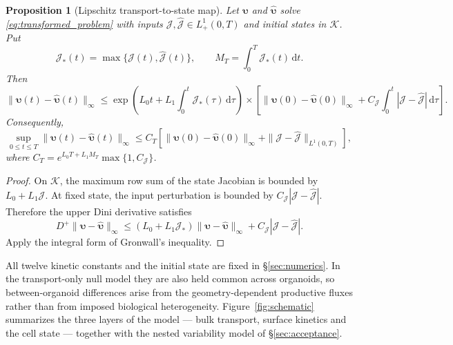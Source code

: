 \documentclass[pdflatex,sn-mathphys-num]{sn-jnl}
\numberwithin{equation}{section}
\theoremstyle{thmstyleone}%
\newtheorem{proposition}[theorem]{Proposition}
\theoremstyle{definition}
\theoremstyle{remark}
\begin{document}
\begin{proposition}[Lipschitz transport-to-state map]
\label{prop:app_input_state}
Let $\boldsymbol\upsilon$ and $\widehat{\boldsymbol\upsilon}$ solve
\eqref{eq:transformed_problem} with inputs $\mathcal J,\widehat{\mathcal J}\in
L^1_+(0,T)$ and initial states in $\mathcal K$. Put
\[
\mathcal J_*(t)=\max\{\mathcal J(t),\widehat{\mathcal J}(t)\},
\qquad M_T=\int_0^T\mathcal J_*(t)\,\mathrm dt.
\]
Then
\begin{equation}
\|\boldsymbol\upsilon(t)-\widehat{\boldsymbol\upsilon}(t)\|_\infty
\leq \exp\!\left(L_0t+L_1\int_0^t\mathcal J_*(\tau)\,\mathrm d\tau\right) \times\left[
\|\boldsymbol\upsilon(0)-\widehat{\boldsymbol\upsilon}(0)\|_\infty
+C_{\mathcal J}\int_0^t|\mathcal J-\widehat{\mathcal J}|\,\mathrm d\tau
\right].
\label{eq:app_input_state_bound}
\end{equation}
Consequently,
\begin{equation}
\sup_{0\leq t\leq T}
\|\boldsymbol\upsilon(t)-\widehat{\boldsymbol\upsilon}(t)\|_\infty
\leq C_T\left[
\|\boldsymbol\upsilon(0)-\widehat{\boldsymbol\upsilon}(0)\|_\infty
+\|\mathcal J-\widehat{\mathcal J}\|_{L^1(0,T)}\right],
\label{eq:app_gronwall_bound}
\end{equation}
where $C_T=e^{L_0T+L_1M_T}\max\{1,C_{\mathcal J}\}$.
\end{proposition}

\begin{proof}
On $\mathcal K$, the maximum row sum of the state Jacobian is bounded by
$L_0+L_1\mathcal J$. At fixed state, the input perturbation is bounded by
$C_{\mathcal J}|\mathcal J-\widehat{\mathcal J}|$. Therefore the upper Dini
derivative satisfies
\[
D^+\|\boldsymbol\upsilon-\widehat{\boldsymbol\upsilon}\|_\infty
\leq(L_0+L_1\mathcal J_*)
\|\boldsymbol\upsilon-\widehat{\boldsymbol\upsilon}\|_\infty
+C_{\mathcal J}|\mathcal J-\widehat{\mathcal J}|.
\]
Apply the integral form of Gronwall's inequality.
\end{proof}



All twelve kinetic constants and the initial state are fixed in \S\ref{sec:numerics}. In the transport-only null model they are also held common across organoids, so between-organoid differences arise from the
geometry-dependent productive fluxes rather than from imposed biological heterogeneity. Figure~\ref{fig:schematic} summarizes the three layers of the model --- bulk transport, surface kinetics and the cell state --- together with the nested variability model of \S\ref{sec:acceptance}.  
\end{document}
